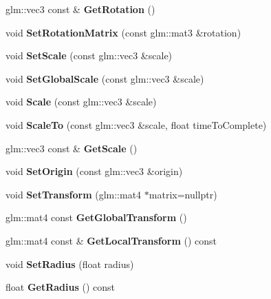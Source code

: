 \begin{DoxyCompactItemize}
\item 
\mbox{\label{classTarbora_1_1SceneNode_af2e83d45cbc7dd953a2cdf42b1582348}} 
glm\+::vec3 const  \& {\bfseries Get\+Rotation} ()
\item 
\mbox{\label{classTarbora_1_1SceneNode_afa97d9c4edb7503c90bbf926b78e3218}} 
void {\bfseries Set\+Rotation\+Matrix} (const glm\+::mat3 \&rotation)
\item 
\mbox{\label{classTarbora_1_1SceneNode_a3ef75206863a0e560773fc6a05175584}} 
void {\bfseries Set\+Scale} (const glm\+::vec3 \&scale)
\item 
\mbox{\label{classTarbora_1_1SceneNode_a4dc8d4d2ba0904386d2d96049cd9c528}} 
void {\bfseries Set\+Global\+Scale} (const glm\+::vec3 \&scale)
\item 
\mbox{\label{classTarbora_1_1SceneNode_a60b1d4854ef5437bf35e9a8ff53b8fb7}} 
void {\bfseries Scale} (const glm\+::vec3 \&scale)
\item 
\mbox{\label{classTarbora_1_1SceneNode_a9b740b9b34f19c2599825c2d0faf6100}} 
void {\bfseries Scale\+To} (const glm\+::vec3 \&scale, float time\+To\+Complete)
\item 
\mbox{\label{classTarbora_1_1SceneNode_ab8cdd38c937c5ee4d9aa7e02f312e9f3}} 
glm\+::vec3 const  \& {\bfseries Get\+Scale} ()
\item 
\mbox{\label{classTarbora_1_1SceneNode_ab5b881724622b9061eb813dfeb43e55e}} 
void {\bfseries Set\+Origin} (const glm\+::vec3 \&origin)
\item 
\mbox{\label{classTarbora_1_1SceneNode_a1823df3fe2d80119d345c402dad8b030}} 
void {\bfseries Set\+Transform} (glm\+::mat4 $\ast$matrix=nullptr)
\item 
\mbox{\label{classTarbora_1_1SceneNode_a00eee97e11b7cb2797b4aff93c9c2416}} 
glm\+::mat4 const {\bfseries Get\+Global\+Transform} ()
\item 
\mbox{\label{classTarbora_1_1SceneNode_a4a02f67eadc615646a500afecdf01f05}} 
glm\+::mat4 const  \& {\bfseries Get\+Local\+Transform} () const
\item 
\mbox{\label{classTarbora_1_1SceneNode_adf2d65499fb59d564af1811e391eed1b}} 
void {\bfseries Set\+Radius} (float radius)
\item 
\mbox{\label{classTarbora_1_1SceneNode_a8851543d02711dc9e017da711bd57607}} 
float {\bfseries Get\+Radius} () const
\end{DoxyCompactItemize}
